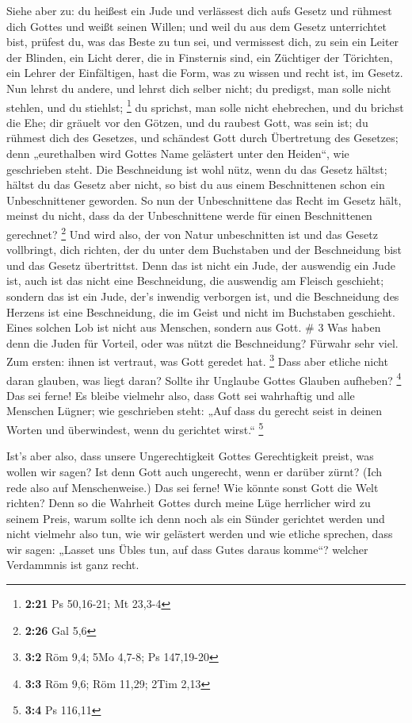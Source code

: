  Siehe aber zu: du heißest ein Jude und verlässest dich
aufs Gesetz und rühmest dich Gottes  und weißt seinen
Willen; und weil du aus dem Gesetz unterrichtet bist, prüfest du, was
das Beste zu tun sei,  und vermissest dich, zu sein ein
Leiter der Blinden, ein Licht derer, die in Finsternis sind,
 ein Züchtiger der Törichten, ein Lehrer der Einfältigen,
hast die Form, was zu wissen und recht ist, im Gesetz.  Nun
lehrst du andere, und lehrst dich selber nicht; du predigst, man solle
nicht stehlen, und du stiehlst; \footnote{\textbf{2:21} Ps 50,16-21; Mt
  23,3-4}  du sprichst, man solle nicht ehebrechen, und du
brichst die Ehe; dir gräuelt vor den Götzen, und du raubest Gott, was
sein ist;  du rühmest dich des Gesetzes, und schändest Gott
durch Übertretung des Gesetzes;  denn „eurethalben wird
Gottes Name gelästert unter den Heiden``, wie geschrieben steht.
 Die Beschneidung ist wohl nütz, wenn du das Gesetz hältst;
hältst du das Gesetz aber nicht, so bist du aus einem Beschnittenen
schon ein Unbeschnittener geworden.  So nun der
Unbeschnittene das Recht im Gesetz hält, meinst du nicht, dass da der
Unbeschnittene werde für einen Beschnittenen gerechnet? \footnote{\textbf{2:26}
  Gal 5,6}  Und wird also, der von Natur unbeschnitten ist
und das Gesetz vollbringt, dich richten, der du unter dem Buchstaben und
der Beschneidung bist und das Gesetz übertrittst.  Denn das
ist nicht ein Jude, der auswendig ein Jude ist, auch ist das nicht eine
Beschneidung, die auswendig am Fleisch geschieht;  sondern
das ist ein Jude, der's inwendig verborgen ist, und die Beschneidung des
Herzens ist eine Beschneidung, die im Geist und nicht im Buchstaben
geschieht. Eines solchen Lob ist nicht aus Menschen, sondern aus Gott.
\# 3  Was haben denn die Juden für Vorteil, oder was nützt
die Beschneidung?  Fürwahr sehr viel. Zum ersten: ihnen ist
vertraut, was Gott geredet hat. \footnote{\textbf{3:2} Röm 9,4; 5Mo
  4,7-8; Ps 147,19-20}  Dass aber etliche nicht daran
glauben, was liegt daran? Sollte ihr Unglaube Gottes Glauben aufheben?
\footnote{\textbf{3:3} Röm 9,6; Röm 11,29; 2Tim 2,13}  Das
sei ferne! Es bleibe vielmehr also, dass Gott sei wahrhaftig und alle
Menschen Lügner; wie geschrieben steht: „Auf dass du gerecht seist in
deinen Worten und überwindest, wenn du gerichtet wirst.`` \footnote{\textbf{3:4}
  Ps 116,11}

 Ist's aber also, dass unsere Ungerechtigkeit Gottes
Gerechtigkeit preist, was wollen wir sagen? Ist denn Gott auch
ungerecht, wenn er darüber zürnt? (Ich rede also auf Menschenweise.)
 Das sei ferne! Wie könnte sonst Gott die Welt richten?
 Denn so die Wahrheit Gottes durch meine Lüge herrlicher
wird zu seinem Preis, warum sollte ich denn noch als ein Sünder
gerichtet werden  und nicht vielmehr also tun, wie wir
gelästert werden und wie etliche sprechen, dass wir sagen: „Lasset uns
Übles tun, auf dass Gutes daraus komme``? welcher Verdammnis ist ganz
recht.

